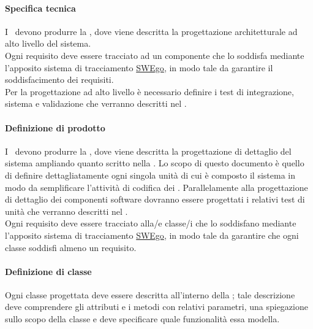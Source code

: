 \documentclass[../NormeDiProgetto.tex]{subfiles}
\begin{document}
			\paragraph{Specifica tecnica\\}
				I \progettisti\ devono produrre la \specificatecnica, dove viene descritta la progettazione architetturale ad
				alto livello del sistema. \\ Ogni requisito deve essere tracciato
				ad un componente che lo soddisfa mediante l'apposito sistema di tracciamento \hyperlink{SWEgo}{SWEgo},
				 in modo tale da garantire
				il soddisfacimento dei requisiti.\\
				Per la progettazione ad alto livello è necessario definire i test di integrazione, sistema e
				validazione che verranno descritti nel \pianodiqualifica.
			
			\paragraph{Definizione di prodotto\\}
				I \progettisti\ devono produrre la , dove viene descritta la progettazione di dettaglio del sistema ampliando quanto scritto nella \specificatecnica.
				Lo scopo di questo documento è quello di definire dettagliatamente ogni singola unità
				di cui è composto il sistema in modo da semplificare l’attività di codifica dei \programmatori.
				Parallelamente alla progettazione di dettaglio dei componenti software dovranno essere
				progettati i relativi test di unità che verranno descritti nel \pianodiqualifica. \\
				Ogni requisito deve essere tracciato alla/e classe/i che lo soddisfano mediante l'apposito sistema di tracciamento \hyperlink{SWEgo}{SWEgo}, in modo tale da garantire
				che ogni classe soddisfi almeno un requisito.\\
			
			\paragraph{Definizione di classe}  %
				Ogni classe progettata deve essere descritta all’interno della ;
				tale descrizione deve comprendere gli attributi e i metodi con relativi parametri, una spiegazione sullo
				scopo della classe e deve specificare quale funzionalità essa modella.
				
\end{document}

